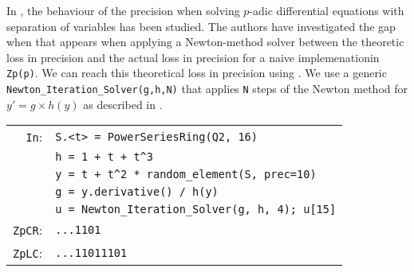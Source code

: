 \documentclass[sigconf]{acmart}
\newcommand{\ZpL}{\text{\color{output} \rm \tt ZpL}\xspace}
\newcommand{\cIn}{{\color{input} \tt \phantom{Zp}In}:}
\newcommand{\cZpCR}{{\color{output} \tt ZpCR}:}
\newcommand{\cZpLC}{{\color{output} \tt ZpLC}:}
\theoremstyle{definition}
\begin{document}
In \cite{LV16}, the behaviour of the precision when solving
$p$-adic differential equations with separation of 
variables has been studied.
The authors have investigated the gap when that appears
when applying a Newton-method solver between
the theoretic loss in precision and the 
actual loss in precision for a naive implemenationin \verb?Zp(p)?.
We can reach this theoretical loss in precision using \ZpL.
We use a generic {\color{function}\verb?Newton_Iteration_Solver?}\verb?(g,h,N)?
that applies \verb?N? steps of the Newton method for 
$y'=g \times h(y)$ as described in \cite{LV16}.

\smallskip

{\noindent \small
\begin{tabular}{rl}
\cIn
 & \verb?S.<t> = ?{\color{constructor}\verb?PowerSeriesRing?}\verb?(?{\color{ring}\verb?Q2?}\verb?, 16)? \\
 & \verb?h = 1 + t + t^3? \\
 & \verb?y = t + t^2 * ?{\color{function}\verb?random_element?}\verb?(S, prec=10)? \\
 & \verb?g = y.derivative() / h(y)? \\
 & \verb?u = ?{\color{function}\verb?Newton_Iteration_Solver?}\verb?(g, h, 4); u[15]? \\
\cZpCR
 & \verb?...1101? \\
\cZpLC
 & \verb?...11011101? \\
\end{tabular}}

\end{document}

